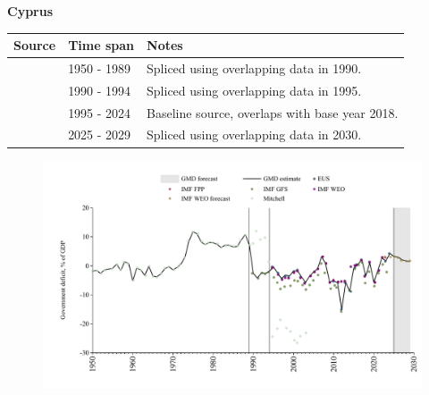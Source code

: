 \documentclass[12pt,a4paper,landscape]{article}
\begin{document}
\begin{adjustbox}{max totalsize={\paperwidth}{\paperheight},center}
\begin{minipage}[t][\textheight][t]{\textwidth}
\vspace*{0.5cm}
{}
\begin{center}
{\Large\bfseries Cyprus}
\end{center}
\vspace{0.5cm}
\begin{table}[H]
\centering
\small
\begin{tabular}{|l|l|l|}
\hline
\textbf{Source} & \textbf{Time span} & \textbf{Notes} \\
\hline
\rowcolor{white}\cite{Mitchell}& 1950 - 1989 &Spliced using overlapping data in 1990.\\
\rowcolor{lightgray}\cite{IMF_GFS}& 1990 - 1994 &Spliced using overlapping data in 1995.\\
\rowcolor{white}\cite{EUS}& 1995 - 2024 &Baseline source, overlaps with base year 2018.\\
\rowcolor{lightgray}\cite{IMF_WEO_forecast}& 2025 - 2029 &Spliced using overlapping data in 2030.\\
\hline
\end{tabular}
\end{table}
\begin{figure}[H]
\centering
\includegraphics[width=\textwidth,height=0.6\textheight,keepaspectratio]{graphs/CYP_govdef_GDP.pdf}
\end{figure}
\end{minipage}
\end{adjustbox}
\end{document}
